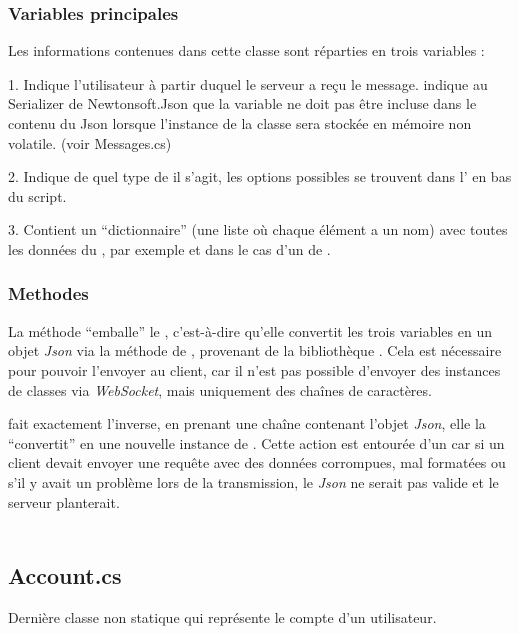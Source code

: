 \documentclass[12pt]{report}
\begin{document}
	\subsubsection{Variables principales}
	Les informations contenues dans cette classe sont réparties en trois variables :
	
	1. Indique l'utilisateur à partir duquel le serveur a reçu le message. 
	\code{[JsonIgnore]} indique au Serializer de Newtonsoft.Json que la variable ne doit pas être incluse dans le contenu du Json lorsque l'instance de la classe sera stockée en mémoire non volatile. (voir Messages.cs)
	
	2. Indique de quel type de  il s'agit, les options possibles se trouvent dans l’  en bas du script.
	
	3. Contient un “dictionnaire” (une liste où chaque élément a un nom) avec toutes les données du , par exemple  et  dans le cas d'un  de  .
	
	\subsubsection{Methodes}
	La méthode  “emballe” le , c'est-à-dire qu'elle convertit les trois variables en un objet \textit{Json} via la méthode  de , provenant de la bibliothèque . Cela est nécessaire pour pouvoir l'envoyer au client, car il n'est pas possible d'envoyer des instances de classes via \textit{WebSocket}, mais uniquement des chaînes de caractères.
	
	 fait exactement l'inverse, en prenant une chaîne contenant l'objet \textit{Json}, elle la “convertit” en une nouvelle instance de . Cette action est entourée d'un  car si un client devait envoyer une requête avec des données corrompues, mal formatées ou s'il y avait un problème lors de la transmission, le \textit{Json} ne serait pas valide et le serveur planterait.
	\\\\
	\subsection{Account.cs}
	Dernière classe non statique qui représente le compte d'un utilisateur.
	
\end{document}
